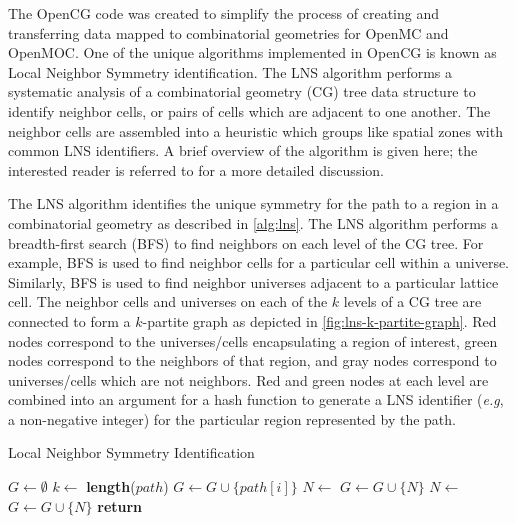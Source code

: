 The OpenCG code \citep{boyd2015opencg} was created to simplify the process of creating and transferring data mapped to combinatorial geometries for OpenMC and OpenMOC. One of the unique algorithms implemented in OpenCG is known as Local Neighbor Symmetry identification. The LNS algorithm performs a systematic analysis of a combinatorial geometry (CG) tree data structure to identify neighbor cells, or pairs of cells which are adjacent to one another. The neighbor cells are assembled into a heuristic which groups like spatial zones with common LNS identifiers. A brief overview of the algorithm is given here; the interested reader is referred to \citep{boyd2015opencg} for a more detailed discussion.

The LNS algorithm identifies the unique symmetry for the path to a region in a combinatorial geometry as described in \autoref{alg:lns}. The LNS algorithm performs a breadth-first search (BFS) to find neighbors on each level of the CG tree. For example, BFS is used to find neighbor cells for a particular cell within a universe. Similarly, BFS is used to find neighbor universes adjacent to a particular lattice cell. The neighbor cells and universes on each of the $k$ levels of a CG tree are connected to form a $k$-partite graph as depicted in \autoref{fig:lns-k-partite-graph}. Red nodes correspond to the universes/cells encapsulating a region of interest, green nodes correspond to the neighbors of that region, and gray nodes correspond to universes/cells which are not neighbors. Red and green nodes at each level are combined into an argument for a hash function to generate a LNS identifier (\textit{e.g}, a non-negative integer) for the particular region represented by the path.

\begin{algorithm*}[h!]
\caption{Local Neighbor Symmetry Identification}
\label{alg:lns}
\begin{algorithmic}[1]
    \State $G \gets \emptyset$ 
    \State $k \gets$ \textbf{length}($path$) 
            \State $G \gets G \cup \{path[i]\}$ 
            \State $N \gets$  
            \State $G \gets G \cup \{N\}$ 
            \State $N \gets$  
            \State $G \gets G \cup \{N\}$ 
        \EndIf
    \EndFor
    \State \textbf{return}  
\EndProcedure
\end{algorithmic}
\end{algorithm*}

